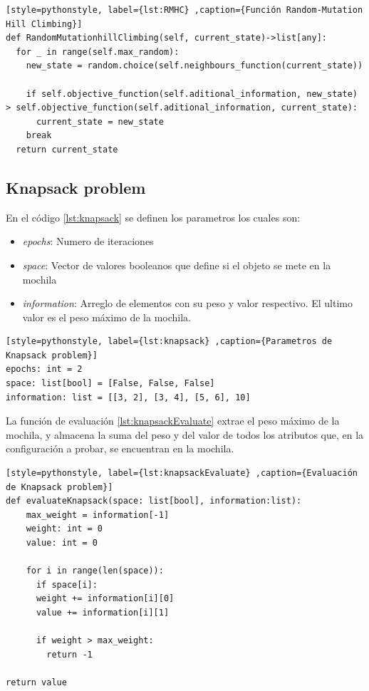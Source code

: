 \documentclass[12pt,twoside]{article}
\begin{document}
\begin{lstlisting}[style=pythonstyle, label={lst:RMHC} ,caption={Función Random-Mutation Hill Climbing}]
def RandomMutationhillClimbing(self, current_state)->list[any]:       
  for _ in range(self.max_random):
    new_state = random.choice(self.neighbours_function(current_state))

    if self.objective_function(self.aditional_information, new_state) > self.objective_function(self.aditional_information, current_state):
      current_state = new_state
    break
  return current_state
\end{lstlisting}

\clearpage
\subsection{Knapsack problem}

En el código \ref{lst:knapsack} se definen los parametros los cuales son:
\begin{itemize}
	\item \textit{epochs}: Numero de iteraciones
	\item \textit{space}: Vector de valores booleanos que define si el objeto se mete en la mochila
	\item \textit{information}: Arreglo de elementos con su peso y valor respectivo. El ultimo valor es el peso máximo de la mochila.  
\end{itemize}

\begin{lstlisting}[style=pythonstyle, label={lst:knapsack} ,caption={Parametros de Knapsack problem}]
epochs: int = 2
space: list[bool] = [False, False, False]
information: list = [[3, 2], [3, 4], [5, 6], 10]
\end{lstlisting}

La función de evaluación \ref{lst:knapsackEvaluate} extrae el peso máximo de la mochila, y almacena la suma del peso y del valor de todos los atributos que, en la configuración a probar, se encuentran en la mochila. 

\begin{lstlisting}[style=pythonstyle, label={lst:knapsackEvaluate} ,caption={Evaluación de Knapsack problem}]
def evaluateKnapsack(space: list[bool], information:list):
	max_weight = information[-1]
	weight: int = 0
	value: int = 0
	
	for i in range(len(space)):
	  if space[i]:
	  weight += information[i][0]
	  value += information[i][1]
	
	  if weight > max_weight:
	    return -1
	
return value
\end{lstlisting}
\end{document}

